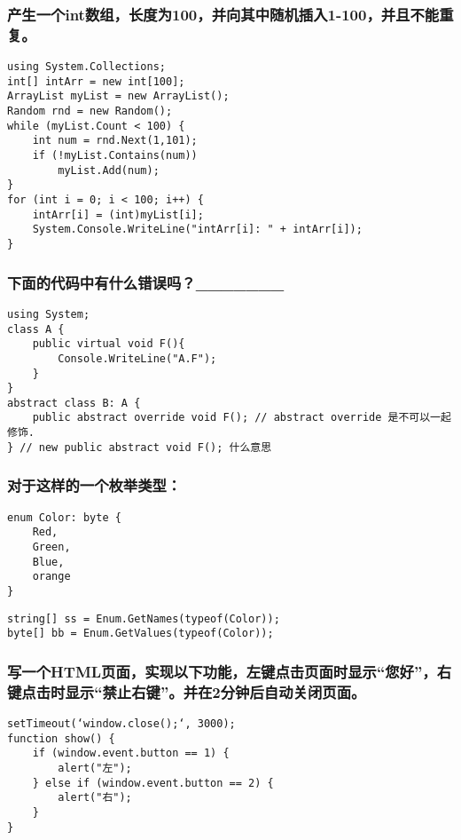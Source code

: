 \documentclass[9pt, b5paper]{article}
\begin{document}
\subsubsection{产生一个int数组，长度为100，并向其中随机插入1-100，并且不能重复。}
\label{sec-1-1-106}
\begin{verbatim}
using System.Collections;
int[] intArr = new int[100];
ArrayList myList = new ArrayList();
Random rnd = new Random();
while (myList.Count < 100) {
    int num = rnd.Next(1,101);
    if (!myList.Contains(num))
        myList.Add(num);
}
for (int i = 0; i < 100; i++) {
    intArr[i] = (int)myList[i];
    System.Console.WriteLine("intArr[i]: " + intArr[i]);
}
\end{verbatim}
\subsubsection{下面的代码中有什么错误吗？\_\_\_\_\_\_\_}
\label{sec-1-1-107}
\begin{verbatim}
using System;
class A {
    public virtual void F(){
        Console.WriteLine("A.F");
    }
}
abstract class B: A {
    public abstract override void F(); // abstract override 是不可以一起修饰.
} // new public abstract void F(); 什么意思
\end{verbatim}
\subsubsection{对于这样的一个枚举类型：}
\label{sec-1-1-108}
\begin{verbatim}
enum Color: byte {
    Red,
    Green,
    Blue,
    orange
}
\end{verbatim}
\begin{verbatim}
string[] ss = Enum.GetNames(typeof(Color));
byte[] bb = Enum.GetValues(typeof(Color));
\end{verbatim}
\subsubsection{写一个HTML页面，实现以下功能，左键点击页面时显示“您好”，右键点击时显示“禁止右键”。并在2分钟后自动关闭页面。}
\label{sec-1-1-109}
\begin{verbatim}
setTimeout(‘window.close();‘, 3000);
function show() {
    if (window.event.button == 1) {
        alert("左");
    } else if (window.event.button == 2) {
        alert("右");
    }
}
\end{verbatim}
\end{document}
